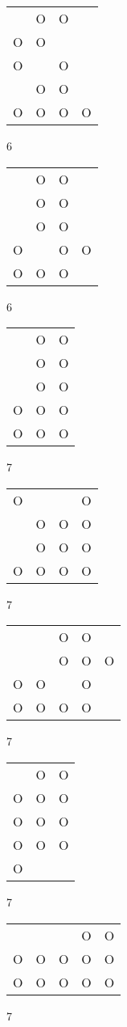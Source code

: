 \begin{tabular}{|m{0.2cm}m{0.2cm}m{0.2cm}m{0.2cm}|}\hline
 &O&O& \\
O&O& & \\
O& &O& \\
 &O&O& \\
O&O&O&O\\
\hline\end{tabular}6
\begin{tabular}{|m{0.2cm}m{0.2cm}m{0.2cm}m{0.2cm}|}\hline
 &O&O& \\
 &O&O& \\
 &O&O& \\
O& &O&O\\
O&O&O& \\
\hline\end{tabular}6
\begin{tabular}{|m{0.2cm}m{0.2cm}m{0.2cm}|}\hline
 &O&O\\
 &O&O\\
 &O&O\\
O&O&O\\
O&O&O\\
\hline\end{tabular}7
\begin{tabular}{|m{0.2cm}m{0.2cm}m{0.2cm}m{0.2cm}|}\hline
O& & &O\\
 &O&O&O\\
 &O&O&O\\
O&O&O&O\\
\hline\end{tabular}7
\begin{tabular}{|m{0.2cm}m{0.2cm}m{0.2cm}m{0.2cm}m{0.2cm}|}\hline
 & &O&O& \\
 & &O&O&O\\
O&O& &O& \\
O&O&O&O& \\
\hline\end{tabular}7
\begin{tabular}{|m{0.2cm}m{0.2cm}m{0.2cm}|}\hline
 &O&O\\
O&O&O\\
O&O&O\\
O&O&O\\
O& & \\
\hline\end{tabular}7
\begin{tabular}{|m{0.2cm}m{0.2cm}m{0.2cm}m{0.2cm}m{0.2cm}|}\hline
 & & &O&O\\
O&O&O&O&O\\
O&O&O&O&O\\
\hline\end{tabular}7
